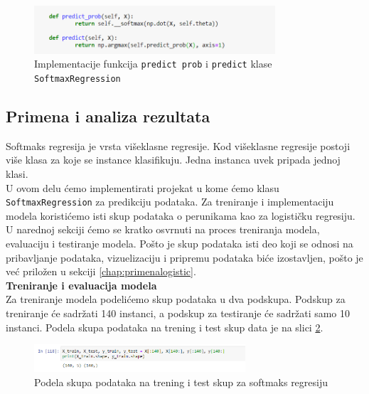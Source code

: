 \documentclass[a4paper,12pt]{report}
\begin{document}
\begin{figure}[h]
    \centering
    \includegraphics[width=0.8\textwidth]{softpred.png}
    \caption{Implementacije funkcija \texttt{predict prob} i \texttt{predict} klase \texttt{SoftmaxRegression}}\label{fig:softpred}
\end{figure}

\subsection{Primena i analiza rezultata}

Softmaks regresija je vrsta višeklasne regresije. Kod višeklasne regresije postoji više klasa za koje se instance klasifikuju. Jedna instanca uvek pripada jednoj klasi. \\ 

U ovom delu ćemo implementirati projekat u kome ćemo klasu \texttt{SoftmaxRegression} za predikciju podataka. Za treniranje i implementaciju modela koristićemo isti skup podataka o perunikama kao za logističku regresiju. U narednoj sekciji ćemo se kratko osvrnuti na proces treniranja modela, evaluaciju i testiranje modela. Pošto je skup podataka isti deo koji se odnosi na pribavljanje podataka, vizuelizaciju i pripremu podataka biće izostavljen, pošto je već priložen u sekciji \ref{chap:primenalogistic}. \\

\textbf{Treniranje i evaluacija modela}\\

Za treniranje modela podelićemo skup podataka u dva podskupa. Podskup za treniranje će sadržati 140 instanci, a podskup za testiranje će sadržati samo 10 instanci. Podela skupa podataka na trening i test skup data je na slici \ref{fig:softsplit}. \\

\begin{figure}[h]
    \centering
    \includegraphics[width=0.7\textwidth]{softmax_split_train_test.png}
    \caption{Podela skupa podataka na trening i test skup za softmaks regresiju}\label{fig:softsplit}
\end{figure}
\end{document}
